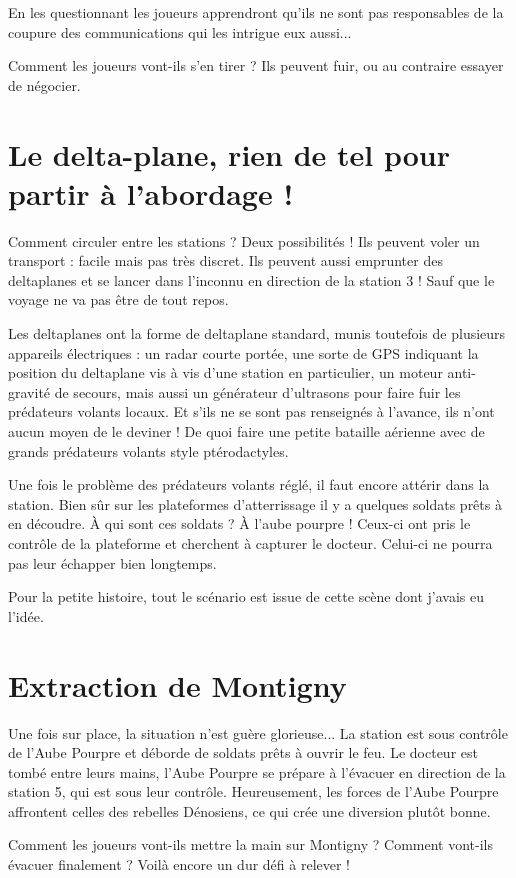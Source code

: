 \begin{multicols*}{2}
En les questionnant les joueurs apprendront qu'ils ne sont pas responsables de la coupure des communications qui les intrigue eux aussi... 

Comment les joueurs vont-ils s'en tirer ? Ils peuvent fuir, ou au contraire essayer de négocier.

\section{Le delta-plane, rien de tel pour partir à l'abordage !}

Comment circuler entre les stations ? Deux possibilités ! Ils peuvent voler un transport : facile mais pas très discret. Ils peuvent aussi emprunter des deltaplanes et se lancer dans l'inconnu en direction de la station 3 ! Sauf que le voyage ne va pas être de tout repos. 

Les deltaplanes ont la forme de deltaplane standard, munis toutefois de plusieurs appareils électriques : un radar courte portée, une sorte de GPS indiquant la position du deltaplane vis à vis d'une station en particulier, un moteur anti-gravité de secours, mais aussi un générateur d'ultrasons pour faire fuir les prédateurs volants locaux. Et s'ils ne se sont pas renseignés à l'avance, ils n'ont aucun moyen de le deviner ! De quoi faire une petite bataille aérienne avec de grands prédateurs volants style ptérodactyles.

Une fois le problème des prédateurs volants réglé, il faut encore attérir dans la station. Bien sûr sur les plateformes d'atterrissage il y a quelques soldats prêts à en découdre. À qui sont ces soldats ? À l'aube pourpre ! Ceux-ci ont pris le contrôle de la plateforme et cherchent à capturer le docteur. Celui-ci ne pourra pas leur échapper bien longtemps.

Pour la petite histoire, tout le scénario est issue de cette scène dont j'avais eu l'idée.

\section{Extraction de Montigny}

Une fois sur place, la situation n'est guère glorieuse... La station est sous contrôle de l'Aube Pourpre et déborde de soldats prêts à ouvrir le feu. Le docteur est tombé entre leurs mains, l'Aube Pourpre se prépare à l'évacuer en direction de la station 5, qui est sous leur contrôle. Heureusement, les forces de l'Aube Pourpre affrontent celles des rebelles Dénosiens, ce qui crée une diversion plutôt bonne.

Comment les joueurs vont-ils mettre la main sur Montigny ? Comment vont-ils évacuer finalement ? Voilà encore un dur défi à relever ! 

\end{multicols*}
